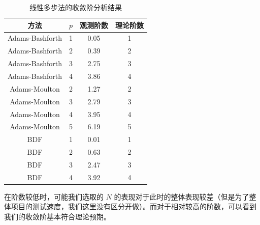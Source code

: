 \documentclass[a4paper]{ctexart} %
\begin{document}
\begin{table}[h!]
\centering
\begin{tabular}{|c|c|c|c|}
\hline
\textbf{方法} & \textbf{$p$} & \textbf{观测阶数} & \textbf{理论阶数} \\ \hline
Adams-Bashforth & 1 & 0.05 & 1 \\ \hline
Adams-Bashforth & 2 & 0.39 & 2 \\ \hline
Adams-Bashforth & 3 & 2.75 & 3 \\ \hline
Adams-Bashforth & 4 & 3.86 & 4 \\ \hline
Adams-Moulton & 2 & 1.27 & 2 \\ \hline
Adams-Moulton & 3 & 2.79 & 3 \\ \hline
Adams-Moulton & 4 & 3.95 & 4 \\ \hline
Adams-Moulton & 5 & 6.19 & 5 \\ \hline
BDF & 1 & 0.01 & 1 \\ \hline
BDF & 2 & 0.63 & 2 \\ \hline
BDF & 3 & 2.47 & 3 \\ \hline
BDF & 4 & 3.92 & 4 \\ \hline
\end{tabular}
\caption{线性多步法的收敛阶分析结果}
\end{table}

在阶数较低时，可能我们选取的 $N$ 的表现对于此时的整体表现较差（但是为了整体项目的测试速度，我们这里没有区分开做）。而对于相对较高的阶数，可以看到我们的收敛阶基本符合理论预期。
\end{document}
